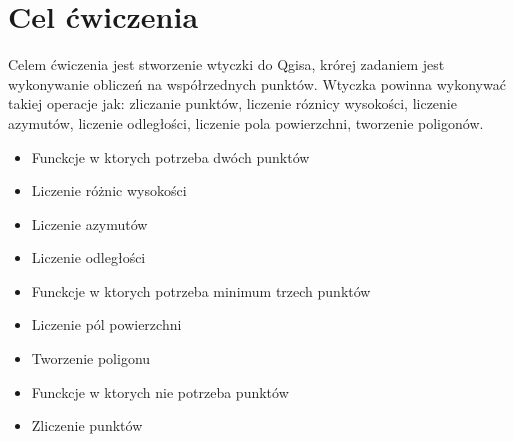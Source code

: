 \section{Cel ćwiczenia}
Celem ćwiczenia jest stworzenie wtyczki do Qgisa, krórej zadaniem jest wykonywanie obliczeń na współrzednych punktów. Wtyczka powinna wykonywać takiej operacje jak: zliczanie punktów, liczenie róznicy wysokości, liczenie azymutów, liczenie odległości, liczenie pola powierzchni, tworzenie poligonów. 

\begin{itemize}
\item[\filledsquare] Funckcje w ktorych potrzeba dwóch punktów
\item Liczenie różnic wysokości
\item Liczenie azymutów
\item Liczenie odległości
\item [\filledsquare] Funckcje w ktorych potrzeba minimum trzech punktów
\item Liczenie pól powierzchni
\item Tworzenie poligonu
\item [\filledsquare] Funckcje w ktorych nie potrzeba punktów
\item Zliczenie punktów
	
\end{itemize}